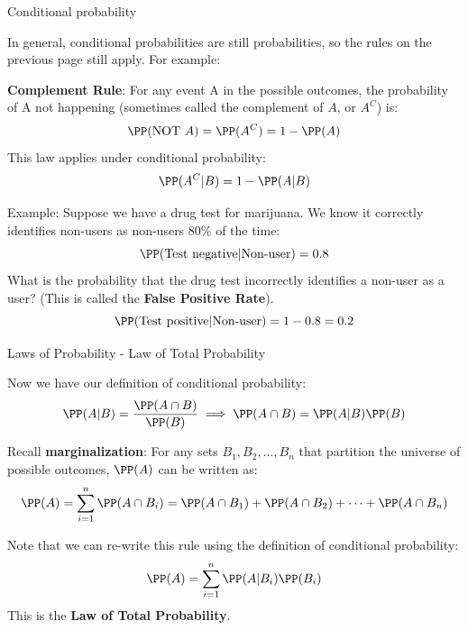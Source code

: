 \documentclass[compress, 8pt]{beamer}
\begin{document}
\begin{frame}{Conditional probability}

In general, conditional probabilities are still probabilities, so the rules on the previous page still apply. For example:


\vspace{3ex}
\textbf{Complement Rule}: For any event A in the possible outcomes, the probability of A not happening (sometimes called the complement of $A$, or $A^C$) is:
\begin{equation*}
    \PP (\text{NOT } A) = \PP (A^C) = 1 - \PP(A)
\end{equation*}
This law applies under conditional probability:
\begin{equation*}
    \PP (A^C \vert B) = 1 - \PP(A \vert B)
\end{equation*}

\pause
\vspace{3ex}
Example: Suppose we have a drug test for marijuana. We know it correctly identifies non-users as non-users 80\% of the time:
\begin{equation*}
    \PP (\text{Test negative} \vert \text{Non-user}) = 0.8
\end{equation*}
What is the probability that the drug test incorrectly identifies a non-user as a user? (This is called the \textbf{False Positive Rate}).
\pause
\begin{equation*}
    \PP (\text{Test positive} \vert \text{Non-user}) = 1 - 0.8 = 0.2    
\end{equation*}

\end{frame}



\begin{frame}{Laws of Probability - Law of Total Probability}

Now we have our definition of conditional probability:
\begin{equation*}
\PP (A \vert B) = \frac{\PP (A \cap B)}{\PP (B)} \implies \PP (A \cap B) = \PP (A \vert B) \PP (B)
\end{equation*}

Recall \textbf{marginalization}: For any sets $B_1, B_2, \dots, B_n$ that partition the universe of possible outcomes, $\PP (A)$ can be written as:
\begin{equation*}
    \PP (A) = \sum_{i=1}^n \PP (A \cap B_i) = \PP (A \cap B_1) + \PP (A \cap B_2) + \dots + \PP (A \cap B_n) 
\end{equation*}

Note that we can re-write this rule using the definition of conditional probability:
\begin{equation*}
    \PP (A) = \sum_{i=1}^n \PP (A \vert B_i) \PP (B_i)
\end{equation*}
This is the \textbf{Law of Total Probability}.


\end{frame}
\end{document}
